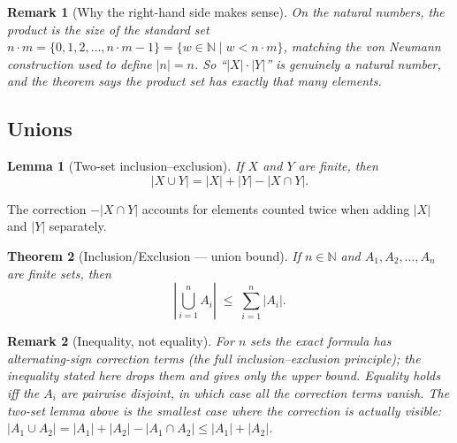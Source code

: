\documentclass[11pt]{article}
\theoremstyle{defstyle}
\theoremstyle{thmstyle}
\newtheorem{theorem}{Theorem}[section]
\newtheorem{lemma}[theorem]{Lemma}
\theoremstyle{notstyle}
\newtheorem*{remark}{Remark}
\theoremstyle{cautionstyle}
\newcommand{\N}{\mathbb{N}}
\newcommand{\card}[1]{\lvert #1 \rvert}
\begin{document}
\begin{notebox}
\begin{remark}[Why the right-hand side makes sense]
On the natural numbers, the product is the size of the standard set
$n \cdot m = \{0, 1, 2, \dots, n \cdot m - 1\} = \{w \in \N \mid w < n \cdot m\}$,
matching the von Neumann construction used to define $\card{n} = n$. So
``$\card{X} \cdot \card{Y}$'' is genuinely a natural number, and the theorem
says the product set has exactly that many elements.
\end{remark}
\end{notebox}

\subsection*{Unions}

\begin{thmbox}
\begin{lemma}[Two-set inclusion--exclusion]
If $X$ and $Y$ are finite, then
\[
  \card{X \cup Y} = \card{X} + \card{Y} - \card{X \cap Y}.
\]
\end{lemma}
\end{thmbox}

The correction $-\card{X \cap Y}$ accounts for elements counted twice when
adding $\card{X}$ and $\card{Y}$ separately.

\begin{thmbox}
\begin{theorem}[Inclusion/Exclusion --- union bound]
If $n \in \N$ and $A_1, A_2, \dots, A_n$ are finite sets, then
\[
  \left\lvert \bigcup_{i=1}^{n} A_i \right\rvert
  \;\leq\;
  \sum_{i=1}^{n} \card{A_i}.
\]
\end{theorem}
\end{thmbox}

\begin{notebox}
\begin{remark}[Inequality, not equality]
For $n$ sets the exact formula has alternating-sign correction terms (the
full inclusion--exclusion principle); the inequality stated here drops them
and gives only the upper bound. Equality holds iff the $A_i$ are pairwise
disjoint, in which case all the correction terms vanish. The two-set lemma
above is the smallest case where the correction is actually visible:
$\card{A_1 \cup A_2} = \card{A_1} + \card{A_2} - \card{A_1 \cap A_2} \leq
\card{A_1} + \card{A_2}$.
\end{remark}
\end{notebox}
\end{document}
